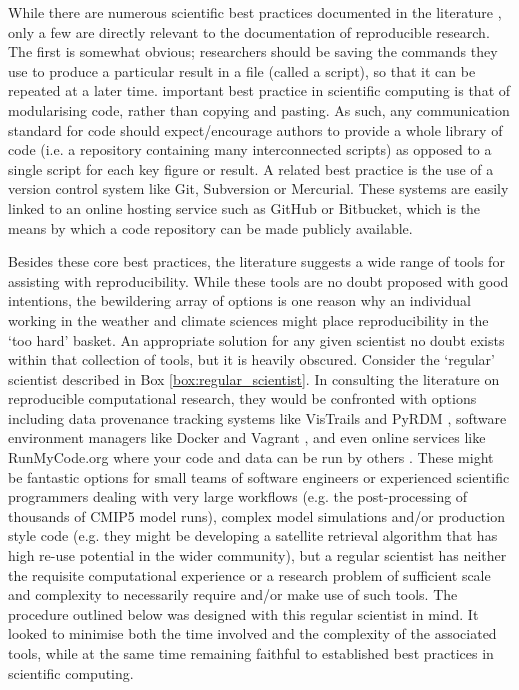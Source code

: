 While there are numerous scientific best practices documented in the literature \citep[e.g.][]{Wilson2014a}, only a few are directly relevant to the documentation of reproducible research. The first is somewhat obvious; researchers should be saving the commands they use to produce a particular result in a file (called a script), so that it can be repeated at a later time.  important best practice in scientific computing is that of modularising code, rather than copying and pasting. As such, any communication standard for code should expect/encourage authors to provide a whole library of code (i.e. a repository containing many interconnected scripts) as opposed to a single script for each key figure or result. A related best practice is the use of a version control system like Git, Subversion or Mercurial. These systems are easily linked to an online hosting service such as GitHub or Bitbucket, which is the means by which a code repository can be made publicly available.

Besides these core best practices, the literature suggests a wide range of tools for assisting with reproducibility. While these tools are no doubt proposed with good intentions, the bewildering array of options is one reason why an individual working in the weather and climate sciences might place reproducibility in the `too hard' basket. An appropriate solution for any given scientist no doubt exists within that collection of tools, but it is heavily obscured. Consider the `regular' scientist described in Box \ref{box:regular_scientist}. In consulting the literature on reproducible computational research, they would be confronted with options including data provenance tracking systems like VisTrails \citep{Freire2012} and PyRDM \citep{Jacobs2014}, software environment managers like Docker and Vagrant \citep{Stodden2014}, and even online services like RunMyCode.org where your code and data can be run by others \citep{Stodden2012}. These might be fantastic options for small teams of software engineers or experienced scientific programmers dealing with very large workflows (e.g. the post-processing of thousands of CMIP5 model runs), complex model simulations and/or production style code (e.g. they might be developing a satellite retrieval algorithm that has high re-use potential in the wider community), but a regular scientist has neither the requisite computational experience or a research problem of sufficient scale and complexity to necessarily require and/or make use of such tools. The procedure outlined below was designed with this regular scientist in mind. It looked to minimise both the time involved and the complexity of the associated tools, while at the same time remaining faithful to established best practices in scientific computing.


